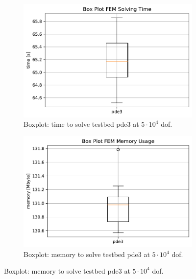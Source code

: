 \documentclass[./\jobname.tex]{subfiles}
\begin{document}
\begin{figure}[H]
	\centering
	\begin{subfigure}[b]{0.5\linewidth}
		\centering
		\includegraphics[width=1\textwidth]{../../code/experiments/_experiment_fem_base/time_boxplot_pde_3.pdf}
		\caption{Boxplot: time to solve testbed \gls{pde}3 at $5\cdot 10^4$ \gls{dof}.}
		\label{fig:_fem_time_boxplot_pde3}
	\end{subfigure}%
	\begin{subfigure}[b]{0.5\linewidth}
		\centering
		\includegraphics[width=1\textwidth]{../../code/experiments/_experiment_fem_base/mem_boxplot_pde_3.pdf}
		\caption{Boxplot: memory to solve testbed \gls{pde}3 at $5\cdot 10^4$ \gls{dof}.}
		\label{fig:_fem_mem_boxplot_pde3}
	\end{subfigure}%
	\label{}
\end{figure}
\end{document}
